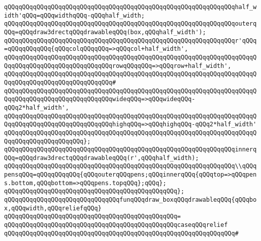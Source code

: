 \verb|qQQqqQQqqQQqqQQqqQQqqQQqqQQqqQQqqQQqqQQqqQQqqQQqqQQqqQQqqQQqqQQqhalf_width'qQQq=qQQqwidthqQQq-qQQqhalf_width;|\newline
\verb|qQQqqQQqqQQqqQQqqQQqqQQqqQQqqQQqqQQqqQQqqQQqqQQqqQQqqQQqqQQqqQQqouterqQQq=qQQqdraw3drectqQQqdrawableqQQq(box,qQQqhalf_width');|\newline
\newline
\verb|qQQqqQQqqQQqqQQqqQQqqQQqqQQqqQQqqQQqqQQqqQQqqQQqqQQqqQQqqQQqqQQqr'qQQq=qQQqqQQqqQQq{qQQqcolqQQqqQQq=>qQQqcol+half_width',|\newline
\verb|qQQqqQQqqQQqqQQqqQQqqQQqqQQqqQQqqQQqqQQqqQQqqQQqqQQqqQQqqQQqqQQqqQQqqQQqqQQqqQQqqQQqqQQqqQQqqQQqqQQqrowqQQqqQQq=>qQQqrow+half_width',|\newline
\verb|qQQqqQQqqQQqqQQqqQQqqQQqqQQqqQQqqQQqqQQqqQQqqQQqqQQqqQQqqQQqqQQqqQQqqQQqqQQqqQQqqQQqqQQqqQQqqQQqqQQq#|\newline
\verb|qQQqqQQqqQQqqQQqqQQqqQQqqQQqqQQqqQQqqQQqqQQqqQQqqQQqqQQqqQQqqQQqqQQqqQQqqQQqqQQqqQQqqQQqqQQqqQQqqQQqwideqQQq=>qQQqwideqQQq-qQQq2*half_width',|\newline
\verb|qQQqqQQqqQQqqQQqqQQqqQQqqQQqqQQqqQQqqQQqqQQqqQQqqQQqqQQqqQQqqQQqqQQqqQQqqQQqqQQqqQQqqQQqqQQqqQQqqQQqhighqQQq=>qQQqhighqQQq-qQQq2*half_width'|\newline
\verb|qQQqqQQqqQQqqQQqqQQqqQQqqQQqqQQqqQQqqQQqqQQqqQQqqQQqqQQqqQQqqQQqqQQqqQQqqQQqqQQqqQQqqQQqqQQq};|\newline
\newline
\verb|qQQqqQQqqQQqqQQqqQQqqQQqqQQqqQQqqQQqqQQqqQQqqQQqqQQqqQQqqQQqqQQqinnerqQQq=qQQqdraw3drectqQQqdrawableqQQq(r',qQQqhalf_width);|\newline
\newline
\verb|qQQqqQQqqQQqqQQqqQQqqQQqqQQqqQQqqQQqqQQqqQQqqQQqqQQqqQQqqQQqqQQq\\qQQqpensqQQq=qQQqqQQqqQQq{qQQqouterqQQqpens;qQQqinnerqQQq{qQQqtop=>qQQqpens.bottom,qQQqbottom=>qQQqpens.topqQQq};qQQq};|\newline
\verb|qQQqqQQqqQQqqQQqqQQqqQQqqQQqqQQqqQQqqQQqqQQqqQQq};|\newline
\newline
\verb|qQQqqQQqqQQqqQQqqQQqqQQqqQQqqQQqfunqQQqdraw_boxqQQqdrawableqQQq{qQQqbox,qQQqwidth,qQQqreliefqQQq}|\newline
\verb|qQQqqQQqqQQqqQQqqQQqqQQqqQQqqQQqqQQqqQQqqQQqqQQq=|\newline
\verb|qQQqqQQqqQQqqQQqqQQqqQQqqQQqqQQqqQQqqQQqqQQqqQQqcaseqQQqrelief|\newline
\verb|qQQqqQQqqQQqqQQqqQQqqQQqqQQqqQQqqQQqqQQqqQQqqQQqqQQqqQQqqQQqqQQq#|\newline
